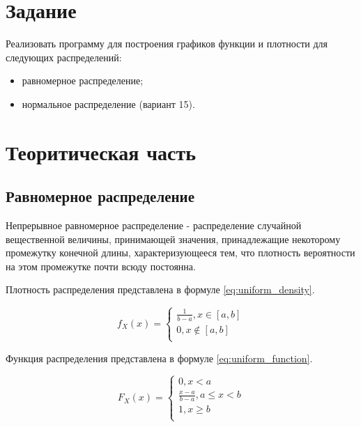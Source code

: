 \documentclass[a4paper, 12pt]{article}
\begin{document}
\tableofcontents
\clearpage
\newpage


\section{{Задание}}

\hspace*{5mm} Реализовать программу для построения графиков функции и плотности для следующих распределений:
\begin{itemize}
	\item равномерное распределение;
	\item нормальное распределение (вариант 15).
\end{itemize}

\section{{Теоритическая часть}}
\subsection{Равномерное распределение}

Непрерывное равномерное распределение - распределение случайной вещественной величины, принимающей значения, принадлежащие некоторому промежутку конечной длины, характеризующееся тем, что плотность вероятности на этом промежутке почти всюду постоянна.

Плотность распределения представлена в формуле \ref{eq:uniform_density}.

\begin{equation}\label{eq:uniform_density}
	f_X (x) =
	\begin{cases}
		\frac{1}{b-a}, x \in [a,b] \\
		0, x \notin [a, b] \\
	\end{cases}
\end{equation}

Функция распределения представлена в формуле \ref{eq:uniform_function}.

\begin{equation}\label{eq:uniform_function}
	F_X (x) =
	\begin{cases}
		0, x < a \\
		\frac{x - a}{b - a}, a \le x < b \\
		1, x \geq b \\
	\end{cases}
\end{equation}
\end{document}
